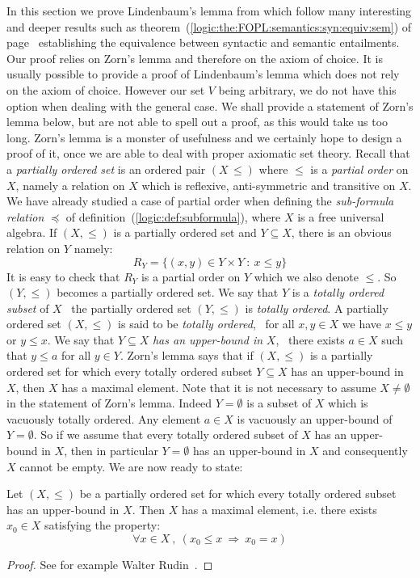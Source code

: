 In this section we prove Lindenbaum's lemma from which follow many
interesting and deeper results such as
theorem~(\ref{logic:the:FOPL:semantics:syn:equiv:sem}) of
page~\pageref{logic:the:FOPL:semantics:syn:equiv:sem} establishing
the equivalence between syntactic and semantic entailments. Our
proof relies on Zorn's lemma and therefore on the axiom of choice.
It is usually possible to provide a proof of Lindenbaum's lemma
which does not rely on the axiom of choice. However our set $V$
being arbitrary, we do not have this option when dealing with the
general case. We shall provide a statement of Zorn's lemma below,
but are not able to spell out a proof, as this would take us too
long. Zorn's lemma is a monster of usefulness and we certainly hope
to design a proof of it, once we are able to deal with proper
axiomatic set theory. Recall that a {\em partially ordered set} is
an ordered pair $(X\,\leq)$ where $\leq$ is a {\em partial order} on
$X$, namely a relation on $X$ which is reflexive, anti-symmetric and
transitive on $X$. We have already studied a case of partial order
when defining the {\em sub-formula relation} $\preceq$ of
definition~(\ref{logic:def:subformula}), where $X$ is a free
universal algebra. If $(X,\leq)$ is a partially ordered set and
$Y\subseteq X$, there is an obvious relation on $Y$ namely:
    \[
    R_{Y}=\{(x,y)\in Y\times Y\ :\ x\leq y\}
    \]
It is easy to check that $R_{Y}$ is a partial order on $Y$ which we
also denote $\leq$. So $(Y,\leq)$ becomes a partially ordered set.
We say that $Y$ is a {\em totally ordered subset} of $X$ \ifand\ the
partially ordered set $(Y,\leq)$ is {\em totally ordered}. A
partially ordered set $(X,\leq)$ is said to be {\em totally
ordered}, \ifand\ for all $x,y\in X$ we have $x\leq y$ or $y\leq x$.
We say that $Y\subseteq X$ {\em has an upper-bound in } $X$, \ifand\
there exists $a\in X$ such that $y\leq a$ for all $y\in Y$. Zorn's
lemma says that if $(X,\leq)$ is a partially ordered set for which
every totally ordered subset $Y\subseteq X$ has an upper-bound in
$X$, then $X$ has a maximal element. Note that it is not necessary
to assume $X\neq\emptyset$ in the statement of Zorn's lemma. Indeed
$Y=\emptyset$ is a subset of $X$ which is vacuously totally ordered.
Any element $a\in X$ is vacuously an upper-bound of $Y=\emptyset$.
So if we assume that every totally ordered subset of $X$ has an
upper-bound in $X$, then in particular $Y=\emptyset$ has an
upper-bound in $X$ and consequently $X$ cannot be empty. We are now
ready to state:

\begin{lemma}\label{logic:lemma:FOPL:semantics:zorn}
Let $(X,\leq)$ be a partially ordered set for which every totally
ordered subset has an upper-bound in $X$. Then $X$ has a maximal
element, i.e. there exists $x_{0}\in X$ satisfying the property:
    \[
    \forall x\in X\ ,\ (x_{0}\leq x\ \Rightarrow\ x_{0}=x)
    \]
\end{lemma}
\begin{proof}
See for example Walter Rudin~\cite{Rudin}.
\end{proof}

